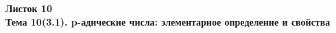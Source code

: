 \documentclass[a4paper, 11pt]{article}
\begin{document}
\begin{center} \Large \bf Листок 10\\ Тема 10(3.1). p-адические числа: элементарное определение и свойства \end{center}


\end{document}
